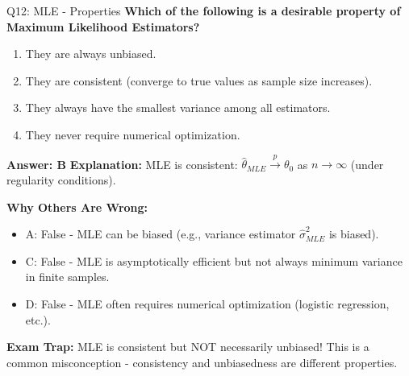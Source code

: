 \documentclass[8pt]{beamer}
\begin{document}
	\begin{frame}{Q12: MLE - Properties}
		\fontsize{6.5}{7.5}\selectfont
		\textbf{Which of the following is a desirable property of Maximum Likelihood Estimators?}
		
		\begin{enumerate}
			\item They are always unbiased.
			\item They are consistent (converge to true values as sample size increases).
			\item They always have the smallest variance among all estimators.
			\item They never require numerical optimization.
		\end{enumerate}
		
		\vspace{0.05cm}
		\textcolor{myblue}{\textbf{Answer: B}}
		\vspace{0.05cm}
		\textcolor{myblue}{\textbf{Explanation:}} MLE is consistent: $\hat{\theta}_{MLE} \xrightarrow{p} \theta_0$ as $n \to \infty$ (under regularity conditions).
		
		\vspace{0.05cm}
		\textcolor{myred}{\textbf{Why Others Are Wrong:}}
		\begin{itemize}
			\item \textcolor{myred}{A:} False - MLE can be biased (e.g., variance estimator $\hat{\sigma}^2_{MLE}$ is biased).
			\item \textcolor{myred}{C:} False - MLE is asymptotically efficient but not always minimum variance in finite samples.
			\item \textcolor{myred}{D:} False - MLE often requires numerical optimization (logistic regression, etc.).
		\end{itemize}
		
		\textcolor{myred}{\textbf{Exam Trap:}} MLE is \textcolor{myblue}{consistent} but NOT necessarily unbiased! This is a common misconception - consistency and unbiasedness are different properties.
	\end{frame}
	
\end{document}
